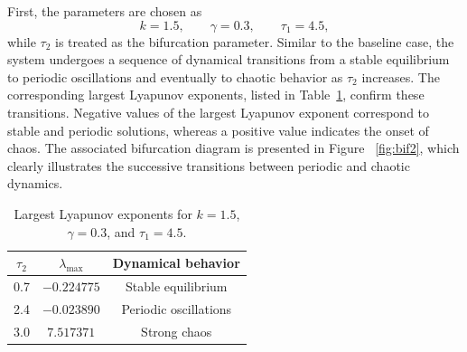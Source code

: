 \documentclass[11pt]{article}
\theoremstyle{remark}
\begin{document}
First, the parameters are chosen as
\[
k=1.5,\qquad \gamma=0.3,\qquad \tau_1=4.5,
\]
while $\tau_2$ is treated as the bifurcation parameter. Similar to the baseline case, the system undergoes a sequence of dynamical transitions from a stable equilibrium to periodic oscillations and eventually to chaotic behavior as $\tau_2$ increases. The corresponding largest Lyapunov exponents, listed in Table~\ref{tab:lyap2}, confirm these transitions. Negative values of the largest Lyapunov exponent correspond to stable and periodic solutions, whereas a positive value indicates the onset of chaos. The associated bifurcation diagram is presented in Figure ~\ref{fig:bif2}, which clearly illustrates the successive transitions between periodic and chaotic dynamics.

\begin{table}[h!]
    \centering
    \caption{Largest Lyapunov exponents for $k=1.5$, $\gamma=0.3$, and $\tau_1=4.5$.}
    \label{tab:lyap2}
    \begin{tabular}{c c c}
        \hline
        $\tau_2$ & $\lambda_{\max}$ & Dynamical behavior \\
        \hline
        0.7 & $-0.224775$ & Stable equilibrium \\
        2.4 & $-0.023890$ & Periodic oscillations \\
        3.0 & $7.517371$ & Strong chaos \\
        \hline
    \end{tabular}
\end{table}
\end{document}
